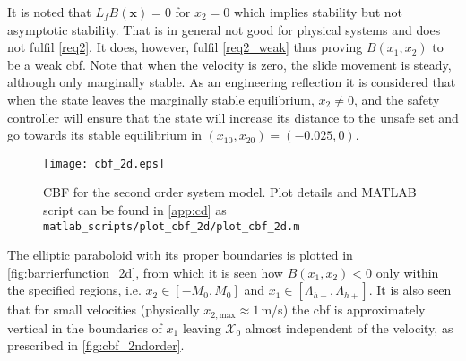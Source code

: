 It is noted that $L_fB(\mathbf{x}) = 0$ for $x_2 = 0$ which implies stability but not asymptotic stability. That is in general not good for physical systems and does not fulfil \autoref{req2}. It does, however, fulfil \autoref{req2_weak} thus proving $B(x_1,x_2)$ to be a weak \gls{cbf}. %
Note that when the velocity is zero, the slide movement is steady, although only marginally stable. %
As an engineering reflection it is considered that when the state leaves the marginally stable equilibrium, $x_2 \neq 0$, and the safety controller  will ensure that the state will increase its distance to the unsafe set and go towards its stable equilibrium in $(x_{10},x_{20})=(-0.025,0)$. 


\begin{figure}[H]
\hspace*{-2mm}
	\texttt{[image: cbf\_2d.eps]}
	\vspace*{-11mm}
	\caption{CBF for the second order system model. Plot details and MATLAB script can be found in \autoref{app:cd} as \texttt{matlab\_scripts/plot\_cbf\_2d/plot\_cbf\_2d.m}}
	\label{fig:barrierfunction_2d}
\end{figure}
The elliptic paraboloid with its proper boundaries is plotted in \autoref{fig:barrierfunction_2d}, from which it is seen how $B(x_1,x_2)<0$ only within the specified regions, i.e. $x_2 \in [-M_0,M_0]$ and $x_1 \in [\Lambda_{h-},\Lambda_{h+}]$. %
It is also seen that for small velocities (physically $x_{2,\text{max}}\approx 1$\,m/s) the \gls{cbf} is approximately vertical in the boundaries of $x_1$ %
leaving $\mathcal{X}_0$ almost independent of the velocity, as prescribed in \autoref{fig:cbf_2ndorder}.

